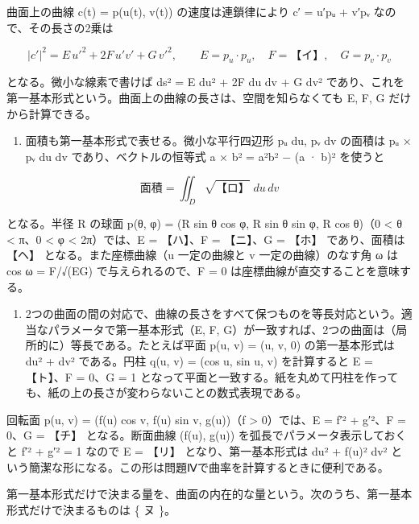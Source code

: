 \documentclass[
  10pt,
  a4paper,
]{article}
\providecommand{\tightlist}{%
  \setlength{\itemsep}{0pt}\setlength{\parskip}{0pt}}
\begin{document}
曲面上の曲線 c(t) = p(u(t), v(t)) の速度は連鎖律により c′ =
u′p{\fallbackfont ᵤ} + v′p{\fallbackfont ᵥ} なので、その長さの2乗は

\[|c'|^2 = E\,u'^2 + 2F\,u'v' + G\,v'^2, \qquad E = p_u \cdot p_u,\quad F = \text{【イ】},\quad G = p_v \cdot p_v\]

となる。微小な線素で書けば ds² = E du² + 2F du dv + G dv²
であり、これを第一基本形式という。曲面上の曲線の長さは、空間を知らなくても
E, F, G だけから計算できる。

\begin{enumerate}
\def\labelenumi{(\arabic{enumi})}
\setcounter{enumi}{1}
\tightlist
\item
  面積も第一基本形式で表せる。微小な平行四辺形 p{\fallbackfont ᵤ} du,
  p{\fallbackfont ᵥ} dv の面積は \textbar p{\fallbackfont ᵤ} ×
  p{\fallbackfont ᵥ}\textbar{} du dv であり、ベクトルの恒等式 \textbar a
  × b\textbar² = \textbar a\textbar²\textbar b\textbar² − (a · b)²
  を使うと
\end{enumerate}

\[\text{面積} = \iint_D \sqrt{\text{【ロ】}}\; du\, dv\]

となる。半径 R の球面 p(θ, φ) = (R sin θ cos φ, R sin θ sin φ, R cos
θ)（0 \textless{} θ \textless{} π、0 \textless{} φ \textless{}
2π）では、E = 【ハ】、F = 【ニ】、G = 【ホ】 であり、面積は 【ヘ】
となる。また座標曲線（u 一定の曲線と v 一定の曲線）のなす角 ω は cos ω =
F/√(EG) で与えられるので、F = 0 は座標曲線が直交することを意味する。

\begin{enumerate}
\def\labelenumi{(\arabic{enumi})}
\setcounter{enumi}{2}
\tightlist
\item
  2つの曲面の間の対応で、曲線の長さをすべて保つものを等長対応という。適当なパラメータで第一基本形式（E,
  F, G）が一致すれば、2つの曲面は（局所的に）等長である。たとえば平面
  p(u, v) = (u, v, 0) の第一基本形式は du² + dv² である。円柱 q(u, v) =
  (cos u, sin u, v) を計算すると E = 【ト】、F = 0、G = 1
  となって平面と一致する。紙を丸めて円柱を作っても、紙の上の長さが変わらないことの数式表現である。
\end{enumerate}

回転面 p(u, v) = (f(u) cos v, f(u) sin v, g(u))（f \textgreater{}
0）では、E = f′² + g′²、F = 0、G = 【チ】 となる。断面曲線 (f(u), g(u))
を弧長でパラメータ表示しておくと f′² + g′² = 1 なので E = 【リ】
となり、第一基本形式は du² + f(u)² dv²
という簡潔な形になる。この形は問題Ⅳで曲率を計算するときに便利である。

第一基本形式だけで決まる量を、曲面の内在的な量という。次のうち、第一基本形式だけで決まるものは
\{ ヌ \}。
\end{document}
